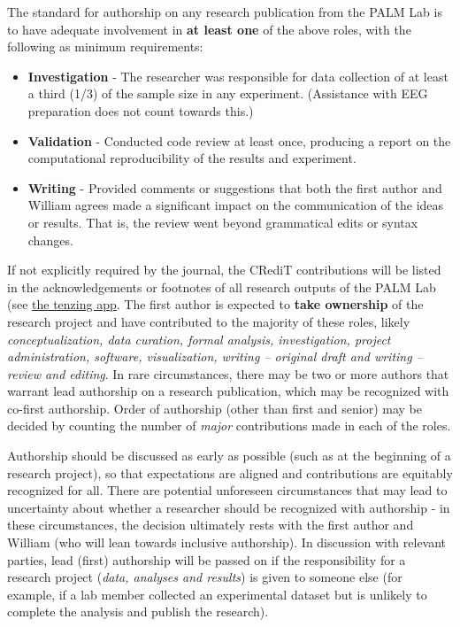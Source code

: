 \documentclass[
]{book}
\providecommand{\tightlist}{%
  \setlength{\itemsep}{0pt}\setlength{\parskip}{0pt}}
\begin{document}
The standard for authorship on any research publication from the PALM Lab is to have adequate involvement in \textbf{at least one} of the above roles, with the following as minimum requirements:

\begin{itemize}
\tightlist
\item
  \textbf{Investigation} - The researcher was responsible for data collection of at least a third (1/3) of the sample size in any experiment. (Assistance with EEG preparation does not count towards this.)
\item
  \textbf{Validation} - Conducted code review at least once, producing a report on the computational reproducibility of the results and experiment.
\item
  \textbf{Writing} - Provided comments or suggestions that both the first author and William agrees made a significant impact on the communication of the ideas or results. That is, the review went beyond grammatical edits or syntax changes.
\end{itemize}

If not explicitly required by the journal, the CRediT contributions will be listed in the acknowledgements or footnotes of all research outputs of the PALM Lab (see \protect\hyperlink{tenzing}{the tenzing app}. The first author is expected to \textbf{take ownership} of the research project and have contributed to the majority of these roles, likely \emph{conceptualization, data curation, formal analysis, investigation, project administration, software, visualization, writing -- original draft and writing -- review and editing}. In rare circumstances, there may be two or more authors that warrant lead authorship on a research publication, which may be recognized with co-first authorship. Order of authorship (other than first and senior) may be decided by counting the number of \emph{major} contributions made in each of the roles.

Authorship should be discussed as early as possible (such as at the beginning of a research project), so that expectations are aligned and contributions are equitably recognized for all. There are potential unforeseen circumstances that may lead to uncertainty about whether a researcher should be recognized with authorship - in these circumstances, the decision ultimately rests with the first author and William (who will lean towards inclusive authorship). In discussion with relevant parties, lead (first) authorship will be passed on if the responsibility for a research project (\emph{data, analyses and results}) is given to someone else (for example, if a lab member collected an experimental dataset but is unlikely to complete the analysis and publish the research).
\end{document}
